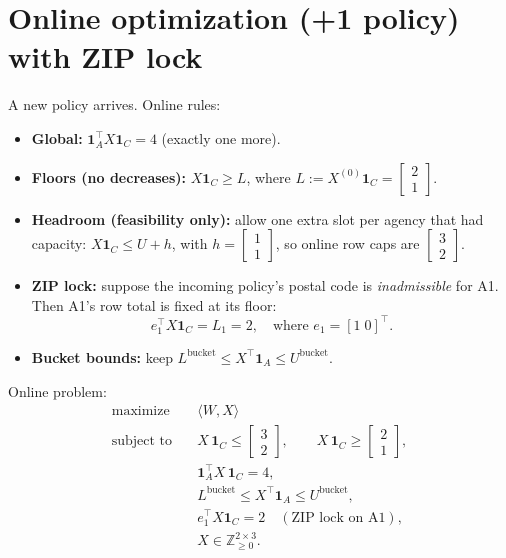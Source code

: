 \documentclass[11pt]{article}
\begin{document}
\section*{Online optimization (+1 policy) with ZIP lock}
A new policy arrives. Online rules:
\begin{itemize}[leftmargin=*]
\item \textbf{Global:} $\mathbf{1}_A^\top X\mathbf{1}_C=4$ (exactly one more).
\item \textbf{Floors (no decreases):} $X\mathbf{1}_C \ge L$, where $L:=X^{(0)}\mathbf{1}_C=\begin{bmatrix}2\\[2pt]1\end{bmatrix}$.
\item \textbf{Headroom (feasibility only):} allow one extra slot per agency that had capacity: $X\mathbf{1}_C \le U+h$, with $h=\begin{bmatrix}1\\[2pt]1\end{bmatrix}$, so online row caps are $\begin{bmatrix}3\\[2pt]2\end{bmatrix}$.
\item \textbf{ZIP lock:} suppose the incoming policy’s postal code is \emph{inadmissible} for A1. Then A1’s row total is fixed at its floor:
\[
e_1^\top X \mathbf{1}_C = L_1 = 2,
\quad \text{where } e_1=[1\;0]^\top.
\]
\item \textbf{Bucket bounds:} keep $L^{\text{bucket}}\le X^\top \mathbf{1}_A \le U^{\text{bucket}}$.
\end{itemize}

Online problem:
\[
\begin{aligned}
\text{maximize}\quad & \langle W,X\rangle \\[2pt]
\text{subject to}\quad
& X\,\mathbf{1}_C \le \begin{bmatrix}3\\[2pt]2\end{bmatrix}, \qquad
X\,\mathbf{1}_C \ge \begin{bmatrix}2\\[2pt]1\end{bmatrix}, \\[4pt]
& \mathbf{1}_A^\top X\,\mathbf{1}_C = 4, \\[4pt]
& L^{\text{bucket}} \le X^\top \mathbf{1}_A \le U^{\text{bucket}}, \\[4pt]
& e_1^\top X \mathbf{1}_C = 2 \quad (\text{ZIP lock on A1}), \\[4pt]
& X \in \mathbb{Z}_{\ge 0}^{2\times 3}.
\end{aligned}
\]
\end{document}
